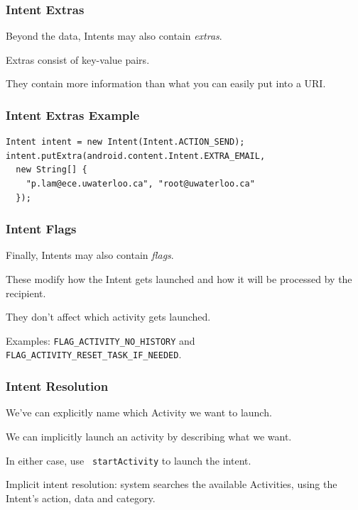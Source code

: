 \begin{frame}
\frametitle{Intent Extras}
\begin{changemargin}{1cm}

Beyond the data, Intents may also contain \emph{extras}. 

Extras
consist of key-value pairs. 

They contain more information than what you
can easily put into a URI.

\end{changemargin}
\end{frame}


\begin{frame}[fragile]
\frametitle{Intent Extras Example}
\begin{changemargin}{1cm}

{\small 
\begin{lstlisting}
Intent intent = new Intent(Intent.ACTION_SEND);
intent.putExtra(android.content.Intent.EXTRA_EMAIL,
  new String[] {
    "p.lam@ece.uwaterloo.ca", "root@uwaterloo.ca"
  });
\end{lstlisting}
}


\end{changemargin}
\end{frame}



\begin{frame}
\frametitle{Intent Flags}
\begin{changemargin}{1cm}

Finally, Intents may also contain \emph{flags}.

These modify how the
Intent gets launched and how it will be processed by the recipient. 


They don't affect which activity gets launched. 

Examples: {\tt FLAG\_ACTIVITY\_NO\_HISTORY} and 
{\tt FLAG\_ACTIVITY\_RESET\_TASK\_IF\_NEEDED}.

\end{changemargin}
\end{frame}


\begin{frame}
\frametitle{Intent Resolution}
\begin{changemargin}{1cm}
We've can explicitly name which Activity we want to launch.

We can implicitly launch an activity by
describing what we want. 

In either case, use {\tt
  startActivity}  to launch the intent.

Implicit intent resolution: system searches the
available Activities, using the Intent's action, data
and category.

\end{changemargin}
\end{frame}

